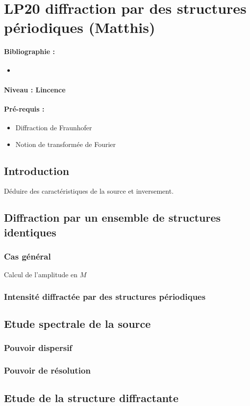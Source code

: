 \section{LP20 diffraction par des structures périodiques (Matthis)}

\paragraph{Bibliographie :}
\begin{itemize}
\item 
\end{itemize}

\paragraph{Niveau : Lincence} 

\paragraph{Pré-requis :}
\begin{itemize}
\item Diffraction de Fraunhofer
\item Notion de transformée de Fourier
\end{itemize}

\subsection{Introduction}

Déduire des caractéristiques de la source et inversement.

\subsection{Diffraction par un ensemble de structures identiques}
\subsubsection{Cas général}

Calcul de l'amplitude en $M$

\subsubsection{Intensité diffractée par des structures périodiques}

\subsection{Etude spectrale de la source}
\subsubsection{Pouvoir dispersif}
\subsubsection{Pouvoir de résolution}

\subsection{Etude de la structure diffractante}